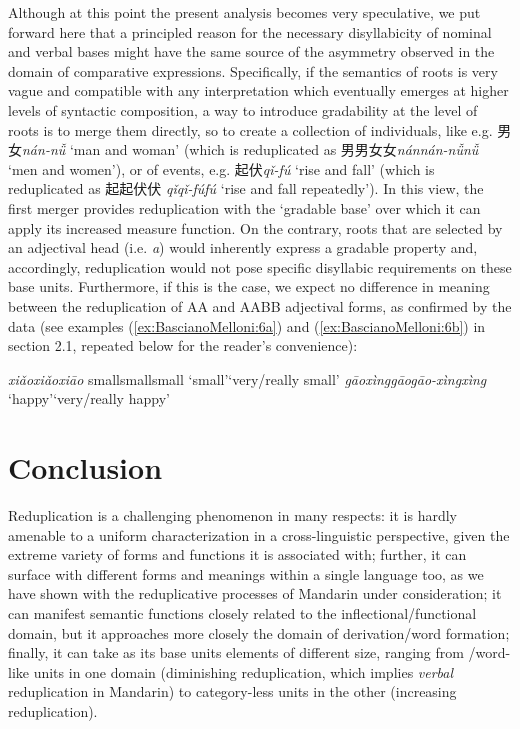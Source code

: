 \documentclass[output=paper]{langsci/langscibook}
\begin{document}
Although at this point the present analysis becomes very speculative, we
put forward here that a principled reason for the necessary
disyllabicity of nominal and verbal bases might have the same source of
the asymmetry observed in the domain of comparative expressions.
Specifically, if the semantics of roots is very vague and compatible
with any interpretation which eventually emerges at higher levels of
syntactic composition, a way to introduce gradability at the level of
roots is to merge them directly, so to create a collection of
individuals, like e.g. 男女\emph{nán-nǚ} `man and woman' (which is
reduplicated as
男男女女\emph{nán\tld{}nán-nǚ\tld{}nǚ} `men and
women'), or of events, e.g. 起伏\emph{qǐ-fú} `rise and fall' (which is
reduplicated as 起起伏伏
\emph{qǐ\tld{}qǐ-fú\tld{}fú} `rise and fall
repeatedly'). In this view, the first merger provides reduplication with
the `gradable base' over which it can apply its increased measure
function. On the contrary, roots that are selected by an adjectival head
(i.e. \emph{a}) would inherently express a gradable property and,
accordingly, reduplication would not pose specific disyllabic
requirements on these base units. Furthermore, if this is the case, we
expect no difference in meaning between the reduplication of AA and AABB
adjectival forms, as confirmed by the data (see examples (\ref{ex:BascianoMelloni:6a}) and (\ref{ex:BascianoMelloni:6b}) in
section 2.1, repeated below for the reader's convenience):

\ea\label{ex:BascianoMelloni:44}
\ea\label{ex:BascianoMelloni:44a}%
        {\emph{xiǎo}}{\emph{xiǎo\tld{}xiāo}}%
        {small}{small\tld{}small}%
        {`small'}{`very/really small'}%
\ex\label{ex:BascianoMelloni:44b}%
        {\emph{gāoxìng}}{\emph{gāo}\tld{}\emph{gāo-xìng}\tld{}\emph{xìng }}%
        {`happy'}{`very/really happy'}%
        {}{}%
\z\z
\section{Conclusion}

Reduplication is a challenging phenomenon in many respects: it is hardly
amen\-able to a uniform characterization in a cross-linguistic
perspective, given the extreme variety of forms and functions it is
associated with; further, it can surface with different forms and
meanings within a single language too, as we have shown with the
reduplicative processes of Mandarin under consideration; it can manifest
semantic functions closely related to the inflectional/functional
domain, but it approaches more closely the domain of derivation/word
formation; finally, it can take as its base units elements of different
size, ranging from /word-like units in one domain (diminishing
reduplication, which implies \emph{verbal} reduplication in Mandarin) to
category-less units in the other (increasing reduplication).
\end{document}
